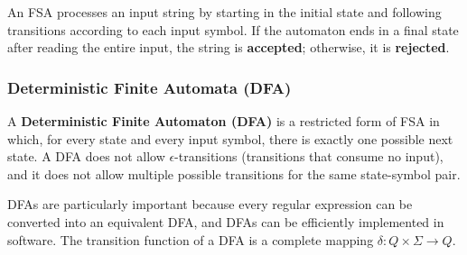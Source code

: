 \documentclass[11pt,a4paper]{article}
\begin{document}
An FSA processes an input string by starting in the initial state and following transitions according to each input symbol. If the automaton ends in a final state after reading the entire input, the string is \textbf{accepted}; otherwise, it is \textbf{rejected}.

\subsubsection{Deterministic Finite Automata (DFA)}

A \textbf{Deterministic Finite Automaton (DFA)} is a restricted form of FSA in which, for every state and every input symbol, there is exactly one possible next state. A DFA does not allow $\epsilon$-transitions (transitions that consume no input), and it does not allow multiple possible transitions for the same state-symbol pair.

DFAs are particularly important because every regular expression can be converted into an equivalent DFA, and DFAs can be efficiently implemented in software. The transition function of a DFA is a complete mapping $\delta: Q \times \Sigma \to Q$.

\begin{center}
\end{center}
\end{document}
